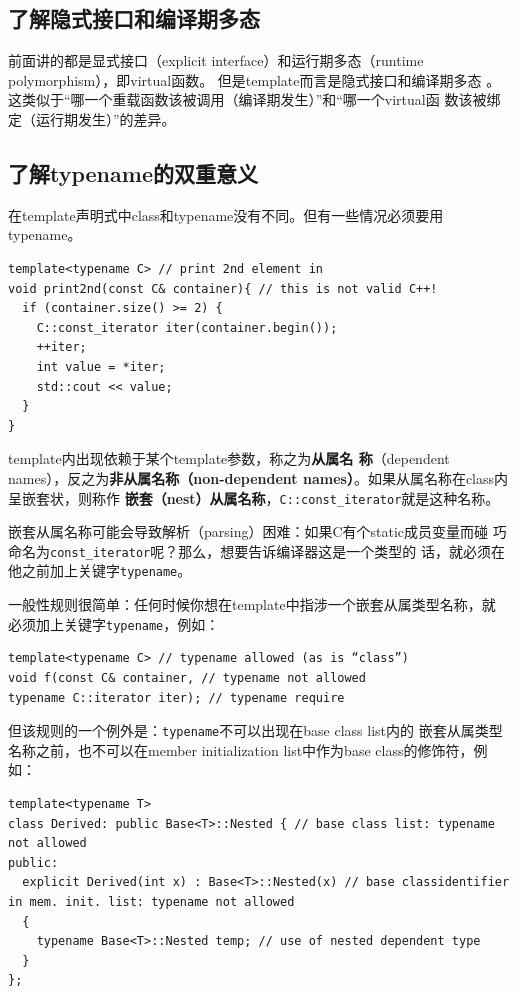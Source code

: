 \subsection{了解隐式接口和编译期多态}
\label{sec:Item-41}

前面讲的都是显式接口（explicit interface）和运行期多态（runtime
polymorphism），即virtual函数。 但是template而言是隐式接口和编译期多态
。这类似于“哪一个重载函数该被调用（编译期发生）”和“哪一个virtual函
数该被绑定（运行期发生）”的差异。

\subsection{了解typename的双重意义}
\label{sec:Item-42}

在template声明式中class和typename没有不同。但有一些情况必须要用
typename。

\begin{verbatim}
template<typename C> // print 2nd element in
void print2nd(const C& container){ // this is not valid C++!
  if (container.size() >= 2) {
    C::const_iterator iter(container.begin());
    ++iter;
    int value = *iter;
    std::cout << value;
  }
}
\end{verbatim}

template内出现依赖于某个template参数，称之为\textbf{从属名
  称}（dependent names），反之为\textbf{非从属名称（non-dependent
  names）}。如果从属名称在class内呈嵌套状，则称作
\textbf{嵌套（nest）从属名称}，\texttt{C::const\_iterator}就是这种名称。

嵌套从属名称可能会导致解析（parsing）困难：如果C有个static成员变量而碰
巧命名为\texttt{const\_iterator}呢？那么，想要告诉编译器这是一个类型的
话，就必须在他之前加上关键字\texttt{typename}。

一般性规则很简单：任何时候你想在template中指涉一个嵌套从属类型名称，就
必须加上关键字\texttt{typename}，例如：
\begin{verbatim}
template<typename C> // typename allowed (as is “class”)
void f(const C& container, // typename not allowed
typename C::iterator iter); // typename require
\end{verbatim}

但该规则的一个例外是：\texttt{typename}不可以出现在base class list内的
嵌套从属类型名称之前，也不可以在member initialization list中作为base
class的修饰符，例如：
\begin{verbatim}
template<typename T>
class Derived: public Base<T>::Nested { // base class list: typename not allowed
public: 
  explicit Derived(int x) : Base<T>::Nested(x) // base classidentifier in mem. init. list: typename not allowed
  {
    typename Base<T>::Nested temp; // use of nested dependent type
  }
};
\end{verbatim}

